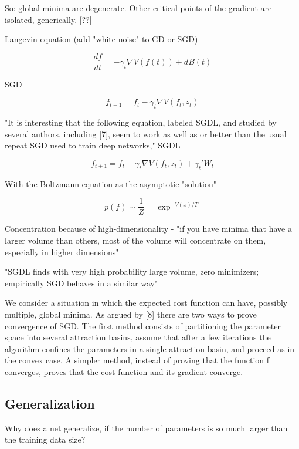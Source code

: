 \documentclass[english]{article}
\begin{document}
So: global minima are degenerate. Other critical points of the gradient are isolated, generically. [??]

\item Langevin equation (add "white noise" to GD or SGD)

$$\frac{df}{dt}
=
-\gamma_t 
\nabla V(f(t))
+dB(t)
$$

SGD 

$$f_{t+1}
=
f_t
-\gamma_t 
\nabla V(f_t,z_t)
$$


"It is interesting that the following equation, labeled SGDL,
and studied by several authors, including [7], seem to work as
well as or better than the usual repeat SGD used to train deep
networks," SGDL 

$$f_{t+1}
=
f_t
-\gamma_t 
\nabla V(f_t,z_t)
+\gamma_t' W_t
$$


With the Boltzmann equation as the asymptotic "solution"

$$
p(f) \sim \frac{1}{Z} = \exp^{-V(x)/T}
$$

\item Concentration because of high-dimensionality - "if you have minima that have a larger volume than others, most of the volume will concentrate on them, especially in higher dimensions"


"SGDL finds with very high probability large volume, zero minimizers; empirically SGD behaves in a similar way"

\item We consider a situation in which the expected cost function can have, possibly multiple, global minima. As argued
by [8] there are two ways to prove convergence of SGD. The
first method consists of partitioning the parameter space into
several attraction basins, assume that after a few iterations the
algorithm confines the parameters in a single attraction basin,
and proceed as in the convex case. A simpler method, instead
of proving that the function f converges, proves that the cost
function and its gradient converge.


\eenum

\eenum


\subsection{Generalization}


\benum
\item Why does a net generalize, if the number of parameters is so much larger than the training data size?
\end{document}
